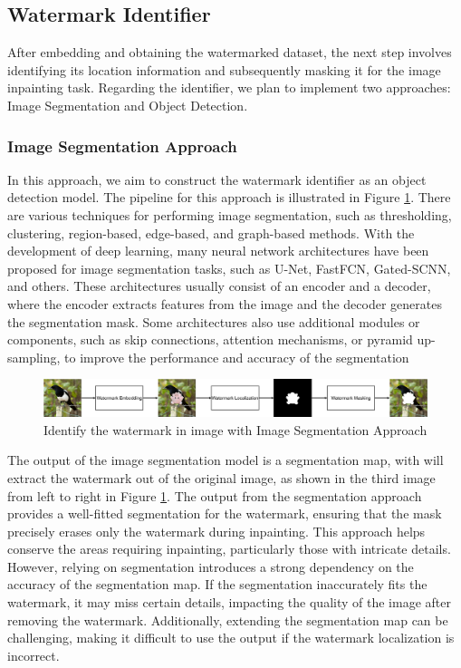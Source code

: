 \subsection{Watermark Identifier}
After embedding and obtaining the watermarked dataset, the next step involves identifying its location information and subsequently masking it for the image inpainting task. Regarding the identifier, we plan to implement two approaches: Image Segmentation and Object Detection.
\subsubsection{Image Segmentation Approach}
In this approach, we aim to construct the watermark identifier as an object detection model. The pipeline for this approach is illustrated in Figure \ref{figure:segmentation}. There are various techniques for performing image segmentation, such as thresholding, clustering, region-based, edge-based, and graph-based methods. With the development of deep learning, many neural network architectures have been proposed for image segmentation tasks, such as U-Net, FastFCN, Gated-SCNN, and others. These architectures usually consist of an encoder and a decoder, where the encoder extracts features from the image and the decoder generates the segmentation mask. Some architectures also use additional modules or components, such as skip connections, attention mechanisms, or pyramid up-sampling, to improve the performance and accuracy of the segmentation
\begin{figure}[H]
 \centering
 \includegraphics[width=\linewidth]{img/segmentation.png}

 \caption{Identify the watermark in image with Image Segmentation Approach}
 \label{figure:segmentation}
\end{figure}

The output of the image segmentation model is a segmentation map, with will extract the watermark out of the original image, as shown in the third image from left to right in Figure \ref{figure:segmentation}. The output from the segmentation approach provides a well-fitted segmentation for the watermark, ensuring that the mask precisely erases only the watermark during inpainting. This approach helps conserve the areas requiring inpainting, particularly those with intricate details. However, relying on segmentation introduces a strong dependency on the accuracy of the segmentation map. If the segmentation inaccurately fits the watermark, it may miss certain details, impacting the quality of the image after removing the watermark. Additionally, extending the segmentation map can be challenging, making it difficult to use the output if the watermark localization is incorrect.
